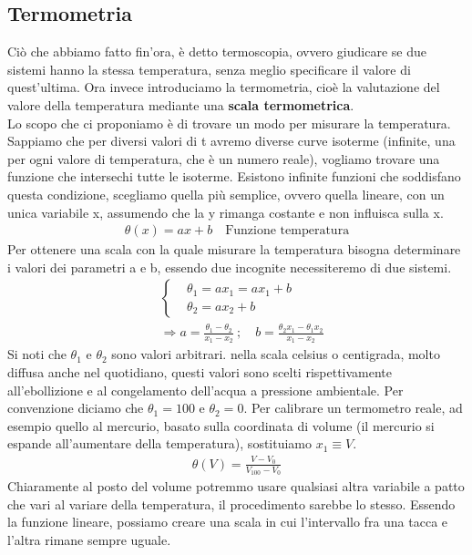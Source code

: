 \documentclass[10pt,a4paper]{article}
\begin{document}
\subsection{Termometria}
Ciò che abbiamo fatto fin'ora, è detto termoscopia, ovvero giudicare se due sistemi hanno la stessa temperatura, senza meglio specificare il valore di quest'ultima. Ora invece introduciamo la termometria, cioè la valutazione del valore della temperatura mediante una \textbf{scala termometrica}. \\
Lo scopo che ci proponiamo è di trovare un modo per misurare la temperatura. Sappiamo che per diversi valori di t avremo diverse curve isoterme (infinite, una per ogni valore di temperatura, che è un numero reale), vogliamo trovare una funzione che intersechi tutte le isoterme. Esistono infinite funzioni che soddisfano questa condizione, scegliamo quella più semplice, ovvero quella lineare, con un unica variabile x, assumendo che la y rimanga costante e non influisca sulla x.
\begin{align*}
	\theta (x) = a x + b \quad \text{Funzione temperatura}
\end{align*} 
Per ottenere una scala con la quale misurare la temperatura bisogna determinare i valori dei parametri a e b, essendo due incognite necessiteremo di due sistemi. 
\begin{align*}
&\begin{cases}
	&\theta_1 = a x_1 = a x_1 + b\\
	&\theta_2 = a x_2 + b  
\end{cases}\\
&\Rightarrow a = \frac{\theta_1 - \theta_2}{x_1 - x_2}\ ; \quad b = \frac{\theta_2 x_1 - \theta_1 x_2}{x_1 - x_2 }
\end{align*}
Si noti che $\theta_1$ e $\theta_2$ sono valori arbitrari. nella scala celsius o centigrada, molto diffusa anche nel quotidiano, questi valori sono scelti rispettivamente all'ebollizione e al congelamento dell'acqua a pressione ambientale. Per convenzione diciamo che $\theta_1 = 100$ e $\theta_2 = 0$. Per calibrare un termometro reale, ad esempio quello al mercurio, basato sulla coordinata di volume (il mercurio si espande all'aumentare della temperatura), sostituiamo $x_1 \equiv V$. 
\begin{align*}
	\theta(V) = \frac{V- V_0}{V_{100}-V_0}
\end{align*}
Chiaramente al posto del volume potremmo usare qualsiasi altra variabile a patto che vari al variare della temperatura, il procedimento sarebbe lo stesso. Essendo la funzione lineare, possiamo creare una scala in cui l'intervallo fra una tacca e l'altra rimane sempre uguale.\\
\end{document}
